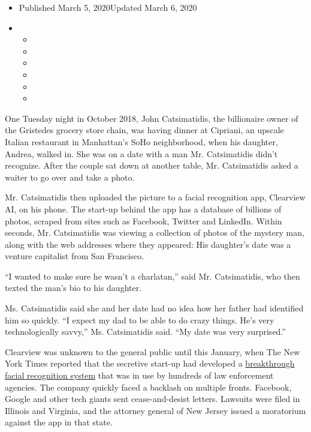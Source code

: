 \begin{itemize}
\item
  Published March 5, 2020Updated March 6, 2020
\item
  \begin{itemize}
  \item
  \item
  \item
  \item
  \item
  \item
  \end{itemize}
\end{itemize}

One Tuesday night in October 2018, John Catsimatidis, the billionaire
owner of the Gristedes grocery store chain, was having dinner at
Cipriani, an upscale Italian restaurant in Manhattan's SoHo
neighborhood, when his daughter, Andrea, walked in. She was on a date
with a man Mr. Catsimatidis didn't recognize. After the couple sat down
at another table, Mr. Catsimatidis asked a waiter to go over and take a
photo.

Mr. Catsimatidis then uploaded the picture to a facial recognition app,
Clearview AI, on his phone. The start-up behind the app has a database
of billions of photos, scraped from sites such as Facebook, Twitter and
LinkedIn. Within seconds, Mr. Catsimatidis was viewing a collection of
photos of the mystery man, along with the web addresses where they
appeared: His daughter's date was a venture capitalist from San
Francisco.

``I wanted to make sure he wasn't a charlatan,'' said Mr. Catsimatidis,
who then texted the man's bio to his daughter.

Ms. Catsimatidis said she and her date had no idea how her father had
identified him so quickly. ``I expect my dad to be able to do crazy
things. He's very technologically savvy,'' Ms. Catsimatidis said. ``My
date was very surprised.''

Clearview was unknown to the general public until this January, when The
New York Times reported that the secretive start-up had developed a
\href{https://www.nytimes3xbfgragh.onion/2020/01/18/technology/clearview-privacy-facial-recognition.html}{breakthrough
facial recognition system} that was in use by hundreds of law
enforcement agencies. The company quickly faced a backlash on multiple
fronts. Facebook, Google and other tech giants sent cease-and-desist
letters. Lawsuits were filed in Illinois and Virginia, and the attorney
general of New Jersey issued a moratorium against the app in that state.

